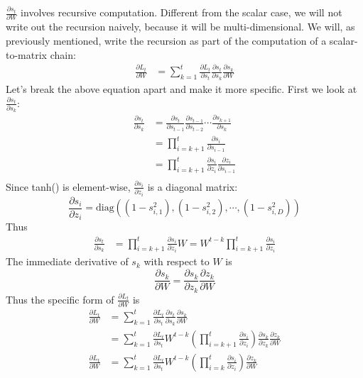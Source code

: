 \documentclass{article}
\begin{document}
$\frac{\partial s_t}{\partial W}$ involves recursive computation. Different from the scalar case, we will not write out the recursion naively, because it will be multi-dimensional. We will, as previously mentioned, write the recursion as part of the computation of a scalar-to-matrix chain:
\begin{align}
    \frac{\partial L_t}{\partial W} &= \sum_{k=1}^t \frac{\partial L_t}{\partial s_t}\frac{\partial s_t}{\partial s_k}\frac{\partial s_k}{\partial W} 
\end{align}
Let's break the above equation apart and make it more specific. First we look at $\frac{\partial s_t}{\partial s_k}$:
\begin{align}
    \frac{\partial s_t}{\partial s_k} &= \frac{\partial s_t}{\partial s_{t-1}}\frac{\partial s_{t-1}}{\partial s_{t-2}}\cdots\frac{\partial s_{k+1}}{\partial s_k} \\
    &= \prod_{i=k+1}^t\frac{\partial s_i}{\partial s_{i-1}} \\
    &= \prod_{i=k+1}^t\frac{\partial s_i}{\partial z_i}\frac{\partial z_i}{\partial s_{i-1}} \\
\end{align}
Since tanh() is element-wise, $\frac{\partial s_i}{\partial z_i}$ is a diagonal matrix:
\begin{equation}
    \frac{\partial s_i}{\partial z_i} = \text{diag}((1-s_{i, 1}^2), (1-s_{i, 2}^2), \cdots, (1-s_{i, D}^2))
\end{equation}
Thus
\begin{align}
    \frac{\partial s_t}{\partial s_k} &= \prod_{i=k+1}^t\frac{\partial s_i}{\partial z_i}W = W^{t-k}\prod_{i=k+1}^t\frac{\partial s_i}{\partial z_i}
\end{align}
The immediate derivative of $s_k$ with respect to $W$ is
\begin{equation}
    \frac{\partial s_k}{\partial W} = \frac{\partial s_k}{\partial z_k}\frac{\partial z_k}{\partial W}  
\end{equation}
Thus the specific form of $\frac{\partial L_t}{\partial W}$ is
\begin{align}
    \frac{\partial L_t}{\partial W} &= \sum_{k=1}^t \frac{\partial L_t}{\partial s_t}\frac{\partial s_t}{\partial s_k}\frac{\partial s_k}{\partial W}\\
    &= \sum_{k=1}^t\frac{\partial L_t}{\partial s_t}W^{t-k}\left(\prod_{i=k+1}^t\frac{\partial s_i}{\partial z_i}\right)\frac{\partial s_k}{\partial z_k}\frac{\partial z_k}{\partial W}\\
    \frac{\partial L_t}{\partial W} &= \sum_{k=1}^t\frac{\partial L_t}{\partial s_t}W^{t-k}\left(\prod_{i=k}^t\frac{\partial s_i}{\partial z_i}\right)\frac{\partial z_k}{\partial W}
\end{align}
\end{document}
